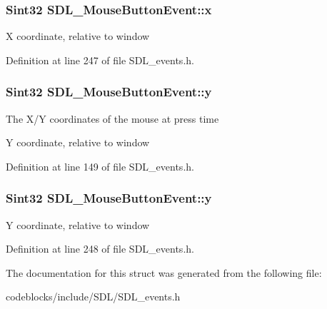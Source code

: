 \hypertarget{structSDL__MouseButtonEvent_a5bb9c61b86e999f58637511e32e3a076}{
\subsubsection[{x}]{\setlength{\rightskip}{0pt plus 5cm}Sint32 S\+D\+L\+\_\+\+Mouse\+Button\+Event\+::x}}\label{structSDL__MouseButtonEvent_a5bb9c61b86e999f58637511e32e3a076}
X coordinate, relative to window 

Definition at line 247 of file S\+D\+L\+\_\+events.\+h.

\hypertarget{structSDL__MouseButtonEvent_a7ccb5c55a7ddadce723f4ea6d5269540}{
\subsubsection[{y}]{\setlength{\rightskip}{0pt plus 5cm}Sint32 S\+D\+L\+\_\+\+Mouse\+Button\+Event\+::y}}\label{structSDL__MouseButtonEvent_a7ccb5c55a7ddadce723f4ea6d5269540}
The X/\+Y coordinates of the mouse at press time

Y coordinate, relative to window 

Definition at line 149 of file S\+D\+L\+\_\+events.\+h.

\hypertarget{structSDL__MouseButtonEvent_a7ccb5c55a7ddadce723f4ea6d5269540}{
\subsubsection[{y}]{\setlength{\rightskip}{0pt plus 5cm}Sint32 S\+D\+L\+\_\+\+Mouse\+Button\+Event\+::y}}\label{structSDL__MouseButtonEvent_a7ccb5c55a7ddadce723f4ea6d5269540}
Y coordinate, relative to window 

Definition at line 248 of file S\+D\+L\+\_\+events.\+h.



The documentation for this struct was generated from the following file\+:\begin{DoxyCompactItemize}
\item 
codeblocks/include/\+S\+D\+L/S\+D\+L\+\_\+events.\+h\end{DoxyCompactItemize}

